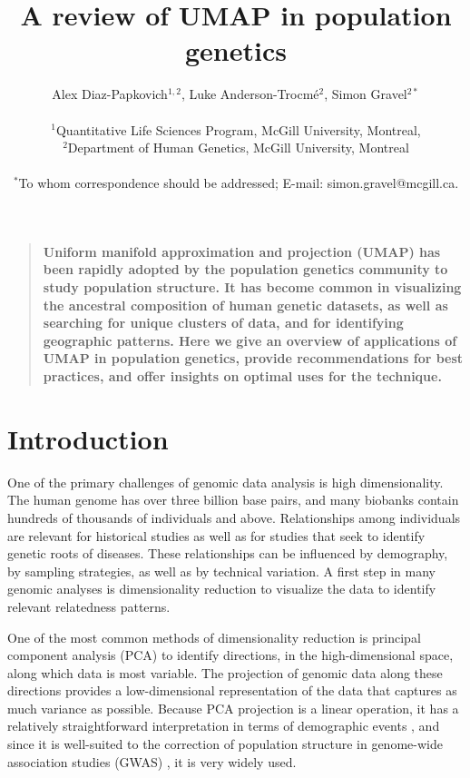 \documentclass[12pt]{article}
\title{A review of UMAP in population genetics}
\author
{Alex Diaz-Papkovich$^{1,2}$, Luke Anderson-Trocm\'{e}$^{2}$, Simon Gravel$^{2\ast}$\\
\\
\normalsize{$^{1}$Quantitative Life Sciences Program, McGill University, Montreal,}\\
\normalsize{$^{2}$Department of Human Genetics, McGill University, Montreal}\\
\\
\normalsize{$^\ast$To whom correspondence should be addressed; E-mail:  simon.gravel@mcgill.ca.}
}
\date{}
\newenvironment{sciabstract}{%
\begin{quote} \bf}
{\end{quote}}
\begin{document}
 


\baselineskip24pt


\maketitle 



\begin{sciabstract}
Uniform manifold approximation and projection (UMAP) has been rapidly adopted by the population genetics community to study population structure. It has become common in visualizing the ancestral composition of human genetic datasets, as well as searching for unique clusters of data, and for identifying geographic patterns. Here we give an overview of applications of UMAP in population genetics, provide recommendations for best practices, and offer insights on optimal uses for the technique.
\end{sciabstract}

\section*{Introduction}

One of the primary challenges of genomic data analysis is high dimensionality. The human genome has over three billion base pairs, and many biobanks contain hundreds of thousands of individuals and above. Relationships among individuals are relevant for historical studies as well as for studies that seek to identify genetic roots of diseases. These relationships can be influenced by demography, by sampling strategies, as well as by technical variation. A first step in many genomic analyses is dimensionality reduction to visualize the data to identify relevant relatedness patterns. 

One of the most common methods of dimensionality reduction is principal component analysis (PCA) to identify directions, in the high-dimensional space, along which data is most variable. The projection of genomic data along these directions provides a low-dimensional representation of the data that captures as much variance as possible. Because PCA projection is a linear operation, it has a relatively straightforward interpretation in terms of demographic events \cite{mcvean2009genealogical}, and since it is well-suited to the correction of population structure in genome-wide association studies (GWAS) \cite{patterson2006population}, it is very widely used.
\end{document}
